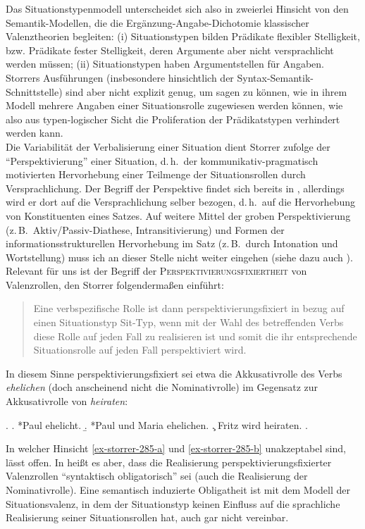 {Das Situationstypenmodell unterscheidet sich also in zweierlei Hinsicht von den Semantik-Modellen, die die Ergänzung-Angabe-Dichotomie klassischer Valenztheorien begleiten: (i) Situationstypen bilden Prädikate flexibler Stelligkeit, bzw. Prädikate fester Stelligkeit, deren Argumente aber nicht versprachlicht werden müssen; (ii) Situationstypen haben Argumentstellen für Angaben. Storrers Ausführungen (insbesondere hinsichtlich der Syntax-Semantik-Schnittstelle) sind aber nicht explizit genug, um sagen zu können, wie in ihrem Modell mehrere Angaben einer Situationsrolle zugewiesen werden können, wie also aus typen-logischer Sicht die Proliferation der Prädikatstypen verhindert werden kann.  \\

Die Variabilität der Verbalisierung einer Situation dient Storrer zufolge der "`Perspektivierung"' einer Situation, d.\,h.\ der kommunikativ-pragmatisch motivierten Hervorhebung einer Teilmenge der Situationsrollen durch Versprachlichung. Der Begriff der Perspektive findet sich bereits in \cite{Fillmore:77,Fillmore:77b}, allerdings wird er dort auf die Versprachlichung selber bezogen, d.\,h.\ auf die Hervorhebung von Konstituenten eines Satzes. Auf weitere Mittel der groben Perspektivierung (z.\,B.\ Aktiv/Passiv-Diathese, Intransitivierung) und Formen der informationsstrukturellen Hervorhebung im Satz (z.\,B.\ durch Intonation und Wortstellung) muss ich an dieser Stelle nicht weiter eingehen (siehe dazu auch \citealt[Kapitel~5]{Duerscheid:99}). Relevant für uns ist der Begriff der \textsc{Perspektivierungsfixiertheit} von Valenzrollen, den Storrer folgenderma\ss en einführt:

\begin{quote}
Eine verbspezifische Rolle ist dann perspektivierungsfixiert in bezug auf einen Situationstyp Sit-Typ, wenn mit der Wahl des betreffenden Verbs diese Rolle auf jeden Fall zu realisieren ist und somit die ihr entsprechende Situationsrolle auf jeden Fall perspektiviert wird. \citep[285]{Storrer:92}
\end{quote}   
In diesem Sinne perspektivierungsfixiert sei etwa die Akkusativrolle des Verbs {\it ehelichen} (doch anscheinend nicht die Nominativrolle) im Gegensatz zur Akkusativrolle von {\it heiraten}:

\ex. \label{ex-storrer-285}
\a. \label{ex-storrer-285-a} *Paul ehelicht.
\b. \label{ex-storrer-285-b} *Paul und Maria ehelichen.
\c. Fritz wird heiraten.
\z. \citep[285]{Storrer:92}

In welcher Hinsicht \ref{ex-storrer-285-a} und \ref{ex-storrer-285-b} unakzeptabel sind, lässt \cite{Storrer:92}  offen. In \citet[240]{Storrer:96} hei\ss t es aber, dass die Realisierung perspektivierungsfixierter Valenzrollen "`syntaktisch obligatorisch"' sei (auch die Realisierung der Nominativrolle). Eine semantisch induzierte Obligatheit ist mit dem Modell der Situationsvalenz, in dem der Situationstyp keinen Einfluss auf die sprachliche Realisierung seiner Situationsrollen hat, auch gar nicht vereinbar.    


}
